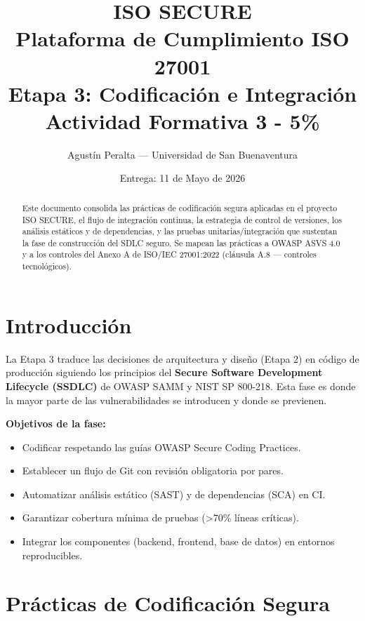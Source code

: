 \documentclass[12pt,a4paper,oneside]{article}
\title{
  {\Huge \textbf{ISO SECURE}}\\
  {\LARGE Plataforma de Cumplimiento ISO 27001}\\[2ex]
  {\Large \textcolor{accent}{Etapa 3: Codificación e Integración}}\\[1ex]
  {\small Actividad Formativa 3 - 5\%}
}
\author{Agustín Peralta --- Universidad de San Buenaventura}
\date{Entrega: 11 de Mayo de 2026}
\begin{document}
\maketitle

\begin{abstract}
Este documento consolida las prácticas de codificación segura aplicadas en el proyecto ISO SECURE, el flujo de integración continua, la estrategia de control de versiones, los análisis estáticos y de dependencias, y las pruebas unitarias/integración que sustentan la fase de construcción del SDLC seguro. Se mapean las prácticas a OWASP ASVS 4.0 y a los controles del Anexo A de ISO/IEC 27001:2022 (cláusula A.8 — controles tecnológicos).
\end{abstract}

\tableofcontents
\newpage

\section{Introducción}

La Etapa 3 traduce las decisiones de arquitectura y diseño (Etapa 2) en código de producción siguiendo los principios del \textbf{Secure Software Development Lifecycle (SSDLC)} de OWASP SAMM y NIST SP 800-218. Esta fase es donde la mayor parte de las vulnerabilidades se introducen \textemdash{} y donde se previenen.

\textbf{Objetivos de la fase:}
\begin{itemize}[leftmargin=*]
  \item Codificar respetando las guías OWASP Secure Coding Practices.
  \item Establecer un flujo de Git con revisión obligatoria por pares.
  \item Automatizar análisis estático (SAST) y de dependencias (SCA) en CI.
  \item Garantizar cobertura mínima de pruebas (>70\% líneas críticas).
  \item Integrar los componentes (backend, frontend, base de datos) en entornos reproducibles.
\end{itemize}

\section{Prácticas de Codificación Segura}
\end{document}
